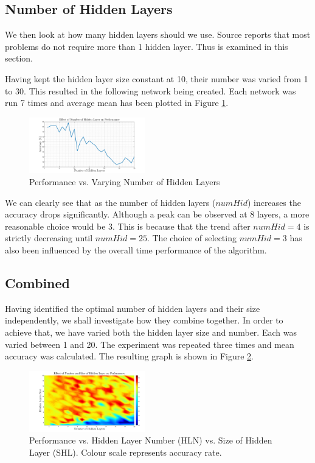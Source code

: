 \documentclass[10pt,twocolumn,letterpaper]{article}
\begin{document}
\subsection{Number of Hidden Layers}

We then look at how many hidden layers should we use. Source \cite{NN_Java} reports that most problems do not require more than 1 hidden layer. Thus is examined in this section.

Having kept the hidden layer size constant at 10, their number was varied from 1 to 30. This resulted in the following network being created. Each network was run 7 times and average mean has been plotted in Figure \ref{fig:HidNum}.

\begin{figure}[H]
\centering
\includegraphics[width=0.45\textwidth]{../results/NN_HiddenLayerNum}
\caption{Performance vs. Varying Number of Hidden Layers
\label{fig:HidNum}}
\end{figure}

We can clearly see that as the number of hidden layers ($numHid$) increases the accuracy drops significantly. Although a peak can be observed at 8 layers, a more reasonable choice would be 3. This is because that the trend after $numHid = 4$ is strictly decreasing until $numHid = 25$. The choice of selecting $numHid = 3$ has also been influenced by the overall time performance of the algorithm.
\subsection{Combined}

Having identified the optimal number of hidden layers and their size independently, we shall investigate how they combine together. In order to achieve that, we have varied both the hidden layer size and number. Each was varied between 1 and 20. The experiment was repeated three times and mean accuracy was calculated. The resulting graph is shown in Figure \ref{fig:NNSizeNum}.

\begin{figure}
\centering
\includegraphics[width=0.45\textwidth]{../results/NN_HidLay_Num_Size4}
\caption{Performance vs. Hidden Layer Number (HLN) vs. Size of Hidden Layer (SHL). Colour scale represents accuracy rate.
\label{fig:NNSizeNum}}
\end{figure}
\end{document}
